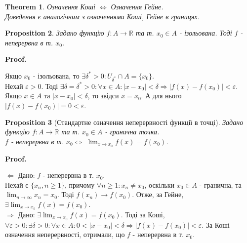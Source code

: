 \documentclass[a4paper, 14pt]{article}
\makeatletter
\def\qed{$\blacksquare$}
\def\rightproof{$\boxed{\Rightarrow}$ }
\def\leftproof{$\boxed{\Leftarrow}$ }
\theoremstyle{theoremdd}
\newtheorem{theorem}{Theorem}[subsection]
\theoremstyle{theoremdd}
\theoremstyle{theoremdd}
\theoremstyle{theoremdd}
\theoremstyle{theoremdd}
\newtheorem{proposition}[theorem]{Proposition}
\theoremstyle{theoremdd}
\theoremstyle{theoremdd}
\theoremstyle{theoremdd}
\renewenvironment{proof}[1][Proof.\\]{\par
\pushQED{\hfill \qed}%
\normalfont \topsep6\p@\@plus6\p@\relax
\trivlist
\item\relax
{\bfseries
#1\@addpunct{.}}\hspace\labelsep\ignorespaces
}{%
\popQED\endtrivlist\@endpefalse
}
\makeatother
\begin{document}
\begin{theorem}
Означення Коші $\iff$ Означення Гейне.\\
\textit{Доведення є аналогічним з означеннями Коші, Гейне в границях.}
\end{theorem}

\begin{proposition}
Задано функцію $f: A \to \mathbb{R}$ та т. $x_0 \in A$ - ізольована. Тоді $f$ - неперервна в т. $x_0$.
\end{proposition}

\begin{proof}
Якщо $x_0$ - ізольована, то $\exists \delta^* > 0: U_{\delta^*} \cap A = \{x_0\}$.\\
Нехай $\varepsilon > 0$. Тоді $\exists \delta = \delta^* > 0: \forall x \in A: |x-x_0|< \delta \Rightarrow |f(x)-f(x_0)|<\varepsilon$.\\
Якщо $x \in A$ та $|x-x_0|< \delta$, то звідси $x=x_0$. А для нього $|f(x)-f(x_0)| = 0 < \varepsilon$.
\end{proof}

\begin{proposition}[Стандартне означення неперервності функції в точці]
Задано функцію $f: A \to \mathbb{R}$ та т. $x_0 \in A$ - гранична точка.\\
$f$ - неперервна в т. $x_0 \iff$ $\displaystyle\lim_{x \to x_0} f(x) = f(x_0)$.
\end{proposition}

\begin{proof}
\leftproof Дано: $f$ - неперервна в т. $x_0$. \\
Нехай є $\{x_n, n \geq 1\}$, причому $\forall n \geq 1: x_n \neq x_0$, оскільки $x_0 \in A$ - гранична, та $\displaystyle\lim_{n \to \infty} x_n = x_0$. Тоді $f(x_n) \to f(x_0)$. Отже, за Гейне, $\exists \displaystyle\lim_{x \to x_0} f(x) = f(x_0)$.
\bigskip \\
\rightproof Дано: $\exists \displaystyle\lim_{x \to x_0} f(x) = f(x_0)$. Тоді за Коші,
$\forall \varepsilon > 0: \exists \delta > 0: \forall x \in A: 0 < |x-x_0| < \delta \Rightarrow |f(x)-f(x_0)| < \varepsilon$.
За Коші означення неперервності, отримали, що $f$ - неперервна в т. $x_0$.
\end{proof}
\end{document}
